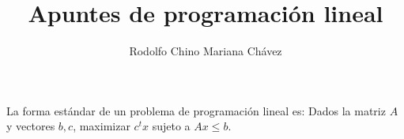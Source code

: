 \documentclass{article}
\title{Apuntes de programación lineal}
\author{Rodolfo Chino Mariana Chávez}
\begin{document}
\maketitle

La forma estándar de un problema de programación lineal es:
Dados la matriz $A$ y vectores $b,c$, maximizar $c^tx$ sujeto a
$Ax\leq b$.
\end{document}
